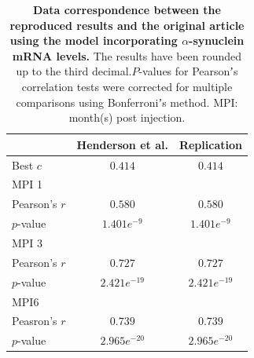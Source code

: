 \begin{table}[ht]
  \begin{center}
    \centering
   
    \begin{tabular}{|l|c|c|} %
      \hline
      
      &\textbf{Henderson et al.} & \textbf{Replication} \hspace{1cm}\\

      \hline
      Best $c$ & $0.414$ & $0.414$ \\
      MPI 1 & &\\
            \hspace{1cm} Pearson's $r$ & $0.580$ & $0.580$\\
            \hspace{1cm} $p$-value & $1.401e^{-9}$ & $1.401e^{-9}$ \\ 

      MPI 3 & &\\
            \hspace{1cm} Pearson's $r$ & $0.727$ & $0.727$ \\
            \hspace{1cm} $p$-value & $2.421e^{-19}$ & $2.421e^{-19}$   \\
            
      MPI6& &\\
            \hspace{1cm} Peasron's $r$ & $0.739$ & $0.739$ \\
            \hspace{1cm} $p$-value & $2.965e^{-20}$ & $2.965e^{-20}$  \\
      \hline
    \end{tabular}
    
    \caption{\textbf{Data correspondence between the reproduced results and the original article using the model incorporating $\alpha$-synuclein mRNA levels.} The results have been rounded up to the third decimal.$P$-values for Pearsonʼs correlation tests were corrected for multiple comparisons using Bonferroniʼs method. MPI: month(s) post injection.}
  \end{center}
\end{table}


